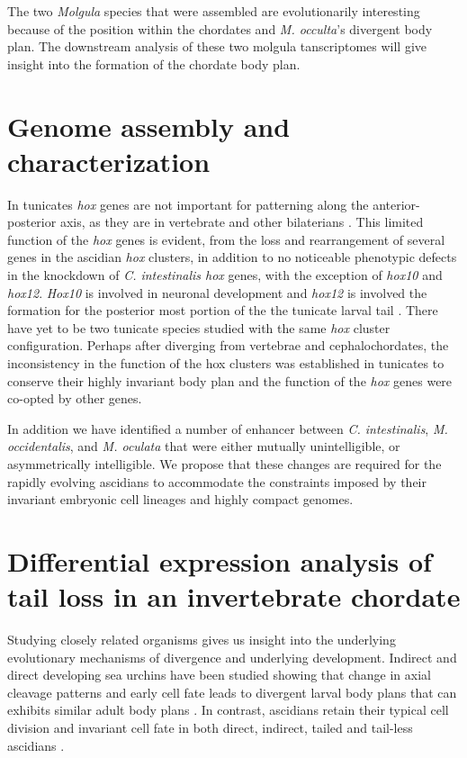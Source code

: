 The two \textit{Molgula} species that were assembled are evolutionarily interesting because of the position within the chordates and \textit{M. occulta}'s divergent body plan. The downstream analysis of these two molgula tanscriptomes will give insight into the formation of the chordate body plan. 

\section{Genome assembly and characterization}
In tunicates \textit{hox} genes are not important for patterning along the anterior-posterior axis, as they are in vertebrate and other bilaterians \cite{finnerty_origins_2003,mallo_regulation_2013,ikuta_limited_2010}. This limited function of the \textit{hox} genes is evident, from the loss and rearrangement of several genes in the ascidian \textit{hox} clusters, in addition to no noticeable phenotypic defects in the knockdown of \textit{C. intestinalis hox} genes, with the exception of \textit{hox10} and \textit{hox12}. \textit{Hox10} is involved in neuronal development and \textit{hox12} is involved the formation for the posterior most portion of the the tunicate larval tail \cite{ikuta_limited_2010}. There have yet to be two tunicate species studied with the same \textit{hox} cluster configuration. Perhaps after diverging from vertebrae and cephalochordates, the inconsistency in the function of the hox clusters was established in tunicates to conserve their highly invariant  body plan and the function of the \textit{hox} genes  were co-opted by other genes. %

In addition we have identified a number of enhancer between \textit{C. intestinalis}, \textit{M. occidentalis}, and \textit{M. oculata} that were either mutually unintelligible, or asymmetrically intelligible. We propose that these changes are required for the rapidly evolving ascidians to accommodate the constraints imposed by their invariant embryonic cell lineages and highly compact genomes.

\section{Differential expression analysis of tail loss in an invertebrate chordate}
Studying closely related organisms gives us insight into the underlying evolutionary mechanisms of divergence and underlying development. Indirect and direct developing sea urchins have been studied showing that change in axial cleavage patterns and early cell fate leads to divergent larval body plans that can exhibits similar adult body plans \cite{wray_evolutionary_1989,henry_evolutionary_1990}. In contrast, ascidians retain their typical cell division and invariant cell fate in both direct, indirect, tailed and tail-less ascidians \cite{jeffery_evolutionary_1991,maliska_molgula_2010}. %
   
